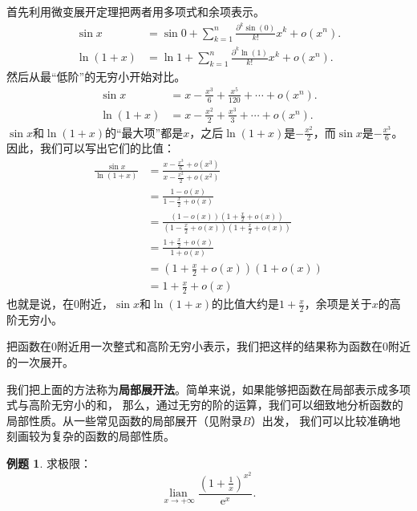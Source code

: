 \documentclass[12pt,UTF8]{ctexbook}
\newcommand{\lian}[1]{
    \underset{#1}{\operatorname{lian}\,}
}
\newcommand{\olim}[1]{\mathit{o}\left(#1\right)}  %
\theoremstyle{definition}
\newtheorem{et}{例题}[section]
\theoremstyle{plain}
\begin{document}
首先利用微变展开定理把两者用多项式和余项表示。
\begin{align*}
    \sin{x} &= \sin{0} + \sum_{k=1}^n \frac{\partial^k \sin (0)}{k!}x^k + \mathit{o}(x^n).  \\
    \ln{(1 + x)} &= \ln{1} + \sum_{k=1}^n \frac{\partial^k \ln (1)}{k!}x^k + \mathit{o}(x^n).  
\end{align*}
然后从最“低阶”的无穷小开始对比。
\begin{align*}
    \sin{x} &= x - \frac{x^3}{6} + \frac{x^5}{120} + \cdots + \mathit{o}(x^n).  \\
    \ln{(1 + x)} &= x - \frac{x^2}{2} + \frac{x^3}{3} + \cdots + \mathit{o}(x^n). 
\end{align*}
$\sin{x}$和$\ln{(1+x)}$的“最大项”都是$x$，之后$\ln{(1+x)}$是$- \frac{x^2}{2}$，而$\sin{x}$是$- \frac{x^3}{6}$。
因此，我们可以写出它们的比值：
\begin{align*}
    \frac{\sin{x}}{\ln{(1 + x)}} &= \frac{x - \frac{x^3}{6} + \olim{x^3}}{x - \frac{x^2}{2} + \olim{x^2}}  \\
    &= \frac{1 - \olim{x}}{1 - \frac{x}{2} + \olim{x}}  \\
    &= \frac{(1 - \olim{x})\left(1 + \frac{x}{2} + \olim{x}\right)}{\left(1 - \frac{x}{2} + \olim{x}\right)\left(1 + \frac{x}{2} + \olim{x}\right)}  \\
    &= \frac{1 + \frac{x}{2} + \olim{x}}{1 + \olim{x}}  \\
    &= \left(1 + \frac{x}{2} + \olim{x}\right)(1 + \olim{x})  \\
    &= 1 + \frac{x}{2} + \olim{x} 
\end{align*}
也就是说，在$0$附近，$\sin{x}$和$\ln{(1+x)}$的比值大约是$1 + \frac{x}{2}$，余项是关于$x$的高阶无穷小。

把函数在$0$附近用一次整式和高阶无穷小表示，我们把这样的结果称为函数在$0$附近的一次展开。

我们把上面的方法称为\textbf{局部展开法}。简单来说，如果能够把函数在局部表示成多项式与高阶无穷小的和，
那么，通过无穷的阶的运算，我们可以细致地分析函数的局部性质。从一些常见函数的局部展开（见附录$B$）出发，
我们可以比较准确地刻画较为复杂的函数的局部性质。

\begin{et}
    求极限：
    $$ \lian{x\to +\infty} \frac{\left(1 + \frac{1}{x}\right)^{x^2}}{\mathrm{e}^x}.$$
\end{et}
\end{document}
